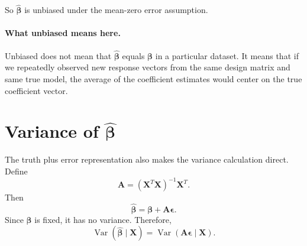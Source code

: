 So \(\widehat{\boldsymbol{\beta}}\) is unbiased under the mean-zero error assumption.

\paragraph{What unbiased means here.}
Unbiased does not mean that \(\widehat{\boldsymbol{\beta}}\) equals \(\boldsymbol{\beta}\) in a particular dataset.  It means that if we repeatedly observed new response vectors from the same design matrix and same true model, the average of the coefficient estimates would center on the true coefficient vector.

\section{Variance of \texorpdfstring{\(\widehat{\boldsymbol{\beta}}\)}{beta-hat}}

The truth plus error representation also makes the variance calculation direct.  Define
\begin{equation}
  \mathbf{A}=(\mathbf{X}^T\mathbf{X})^{-1}\mathbf{X}^T.
\end{equation}
Then
\begin{equation}
  \widehat{\boldsymbol{\beta}}=\boldsymbol{\beta}+\mathbf{A}\boldsymbol{\epsilon}.
\end{equation}
Since \(\boldsymbol{\beta}\) is fixed, it has no variance.  Therefore,
\begin{equation}
  \operatorname{Var}(\widehat{\boldsymbol{\beta}}\mid\mathbf{X})
  =\operatorname{Var}(\mathbf{A}\boldsymbol{\epsilon}\mid\mathbf{X}).
\end{equation}

